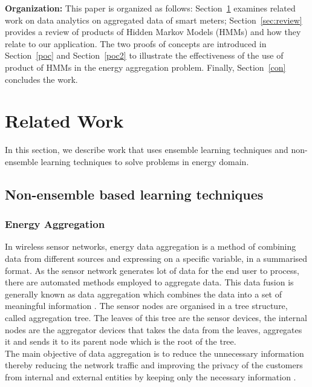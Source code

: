 \documentclass{sig-alternate}
\begin{document}
\noindent \textbf{Organization:} This paper is organized as follows: Section~\ref{related} examines related work on data analytics on aggregated data of smart meters; Section~\ref{sec:review} provides a review of products of Hidden Markov Models (HMMs) and how they relate to our application. The two proofs of concepts are introduced in Section~\ref{poc} and Section~\ref{poc2} to illustrate the effectiveness of the use of product of HMMs in the energy aggregation problem. Finally, Section~\ref{con} concludes the work.

\section{Related Work}
\label{related}
In this section, we describe work that uses ensemble learning techniques and non-ensemble learning techniques to solve problems in energy domain.
\subsection{Non-ensemble based learning techniques}

\subsubsection{Energy Aggregation}
In wireless sensor networks, energy data aggregation is a method of combining data from different sources and expressing on a specific variable, in a summarised format. As the sensor network generates lot of data for the end user to process, there are automated methods employed to aggregate data. This data fusion is generally known as data aggregation which combines the data into a set of meaningful information \cite{Heinzelman00energy}.
The sensor nodes are organised in a tree structure, called aggregation tree. The leaves of this tree are the sensor devices, the internal nodes are the aggregator devices that takes the data from the leaves, aggregates it and sends it to its parent node which is the root of the tree. \\
The main objective of data aggregation is to reduce the unnecessary information thereby reducing the network traffic and improving the privacy of the customers from internal and external entities by keeping only the necessary information \cite{taban}. 


\end{document}
